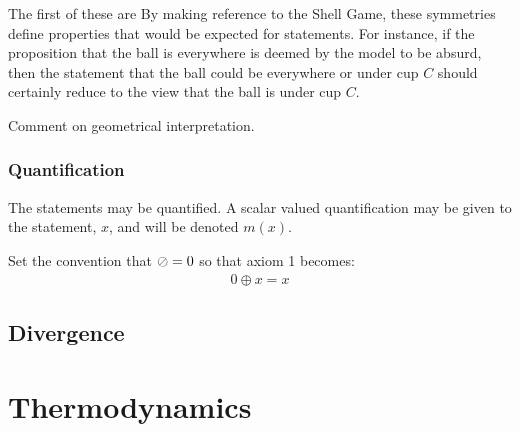 {The first of these are 
By making reference to the Shell Game, 
these symmetries define properties that would be expected for statements.
For instance, if the proposition that the ball is everywhere is deemed by the model to be absurd, 
then the statement that the ball could be everywhere or under cup $C$ should certainly reduce to
the view that the ball is under cup $C$.


Comment on geometrical interpretation.

\subsubsection{Quantification}
The statements may be quantified.  
A scalar valued quantification may be given to the statement, $x$, 
and will be denoted $m(x)$.

Set the convention that $\oslash = 0$
so that axiom 1 becomes:
\begin{align}
  0 \oplus x = x
\end{align}



\subsection{Divergence}


\section{Thermodynamics}

}
